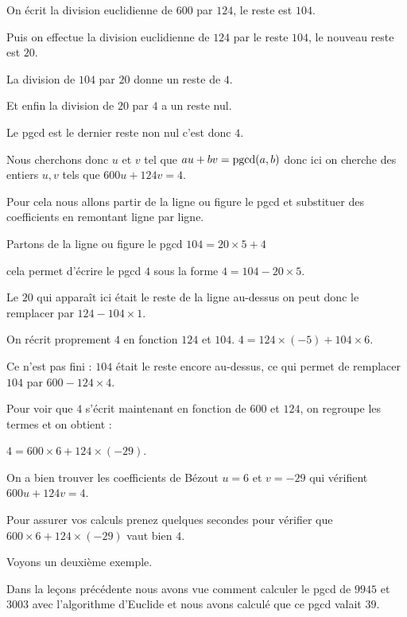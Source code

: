 On écrit la division euclidienne de $600$ par $124$, le reste est $104$.


Puis on effectue la division euclidienne de $124$ par le reste $104$,
le nouveau reste est $20$.

La division de $104$ par $20$ donne un reste de $4$.

Et enfin la division de $20$ par $4$ a un reste nul.

Le pgcd est le dernier reste non nul c'est donc $4$.

\change

Nous cherchons donc $u$ et $v$ tel que $au+bv=\mathop{\mathrm{pgcd}}\nolimits(a,b)$
donc ici on cherche des entiers $u,v$ tels que $600u+124v=4$.


Pour cela nous allons partir de la ligne ou figure le pgcd et
substituer des coefficients en remontant ligne par ligne.

\change

Partons de la ligne ou figure le pgcd
$104 = 20 \times 5 + 4$

cela permet d'écrire le pgcd $4$ sous la forme
$4 = 104 - 20\times 5$.

\change

Le $20$ qui apparaît ici était le reste de la ligne au-dessus
on peut donc le remplacer par $124-104\times 1$.

\change

On récrit proprement $4$ en fonction $124$ et $104$.
$4=124\times (-5) + 104\times 6$.

\change

Ce n'est pas fini : $104$ était le reste encore au-dessus, ce qui permet
de remplacer $104$ par $600-124 \times 4$.



\change

Pour voir que $4$ s'écrit maintenant en fonction de $600$ et $124$, 
on regroupe les termes et on obtient :

$4=600 \times 6 + 124 \times (-29)$.


\change


On a bien trouver les coefficients de Bézout $u=6$ et $v=-29$ qui vérifient  
$600 u+124v=4$.


Pour assurer vos calculs prenez quelques secondes pour vérifier 
que  $600 \times 6 + 124 \times (-29)$ vaut bien $4$.

\diapo

Voyons un deuxième exemple.

Dans la leçons précédente nous avons vue comment calculer
le pgcd de $9945$ et $3003$ avec l'algorithme d'Euclide et nous avons calculé que ce pgcd valait $39$.

